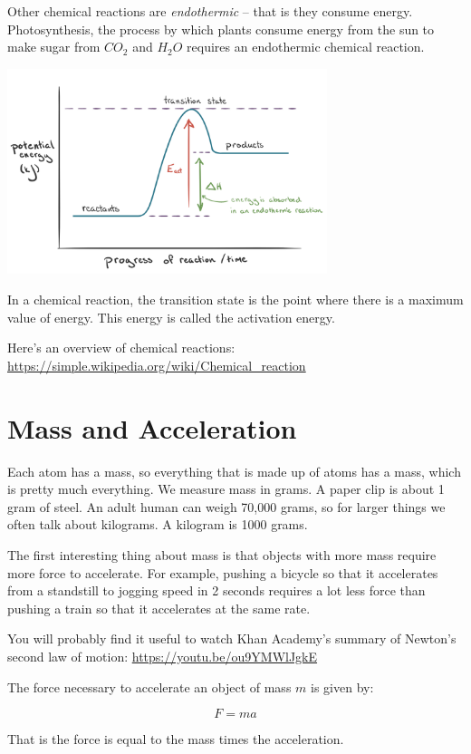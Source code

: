Other chemical reactions are \textit{endothermic} -- that is they consume
energy.  Photosynthesis, the process by which plants consume energy
from the sun to make sugar from $CO_2$ and $H_2O$ requires an endothermic
chemical reaction.

\includegraphics[width=0.7\textwidth]{KA_Endo.png}

In a chemical reaction, the transition state is the point where there is a maximum value of energy. This energy is called the activation energy. 

Here's an overview of chemical reactions: 
\url{https://simple.wikipedia.org/wiki/Chemical_reaction}


\section{Mass and Acceleration}

Each atom has a mass, so everything that is made up of atoms has a
mass, which is pretty much everything.  We measure mass in grams.  A
paper clip is about 1 gram of steel. An adult human can weigh 70,000
grams, so for larger things we often talk about kilograms. A kilogram
is 1000 grams.

The first interesting thing about mass is that objects with more mass
require more force to accelerate. For example, pushing a bicycle so
that it accelerates from a standstill to jogging speed in 2 seconds
requires a lot less force than pushing a train so that it accelerates
at the same rate.

You will probably find it useful to watch Khan Academy's summary of
Newton's second law of motion: \url{https://youtu.be/ou9YMWlJgkE}

\begin{mdframed}[style=important, frametitle={Newton's Second Law of Motion}]

The force necessary to accelerate an object of mass $m$ is given by:

$$F = m a$$

That is the force is equal to the mass times the acceleration.

\end{mdframed}

